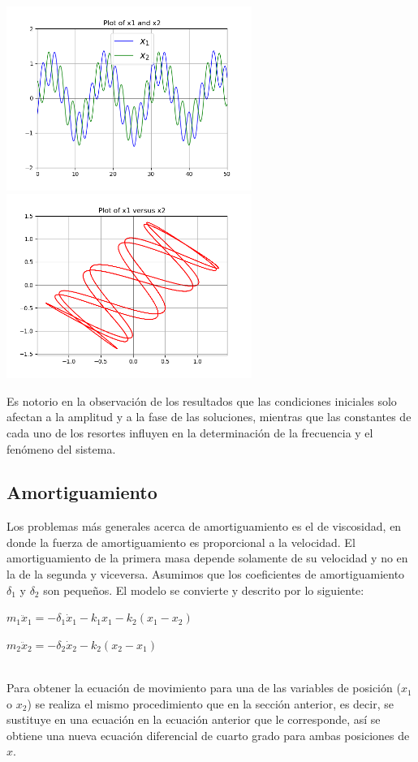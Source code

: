 \documentclass[12pt]{article}
\begin{document}
\begin{center}
    \includegraphics[height=6cm]{G2_3e.png}\hspace*{\fill}
    \includegraphics[height=6cm]{G2_3f.png}\\
\end{center}
Es notorio en la observación de los resultados que las condiciones iniciales solo afectan a la amplitud y a la fase de las soluciones, mientras que las constantes de cada uno de los resortes influyen en la determinación de la frecuencia y el fenómeno del sistema.
\subsection*{Amortiguamiento}
Los problemas más generales acerca de amortiguamiento es el de viscosidad, en donde la fuerza de amortiguamiento es proporcional a la velocidad. El amortiguamiento de la primera masa depende solamente de su velocidad y no en la de la segunda y viceversa. Asumimos que
los coeficientes de amortiguamiento $\delta_1$ y $\delta_2$ son pequeños. El modelo se convierte y descrito por lo siguiente:\\
\centerline{$m_1 \ddot x_1 = -\delta_1 \dot x_1 -k_1x_1 - k_2(x_1-x_2)$}
\centerline{$m_2 \ddot x_2 = -\delta_2 \dot x_2 -k_2(x_2-x_1)$}\\

Para obtener la ecuación de movimiento para una de las variables de posición ($x_1$ o $x_2$) se realiza el mismo procedimiento que en la sección anterior, es decir, se sustituye en una ecuación en la ecuación anterior que le corresponde, así se obtiene una nueva ecuación diferencial de cuarto grado para ambas posiciones de $x$.\\
\end{document}
